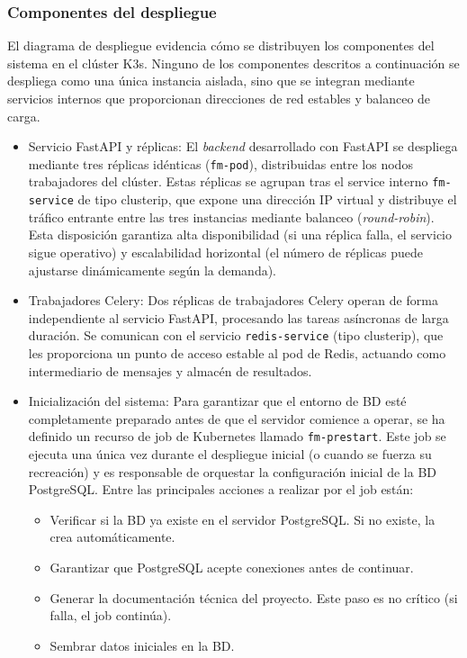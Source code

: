 \subsubsection{Componentes del despliegue}

El diagrama de despliegue evidencia cómo se distribuyen los componentes del sistema en el \gls{clúster} \gls{K3s}. 
Ninguno de los componentes descritos a continuación se despliega como una única instancia aislada, 
sino que se integran mediante servicios internos que proporcionan direcciones de red estables y 
balanceo de carga.

\begin{itemize}
    \item Servicio FastAPI y réplicas: El \textit{backend} desarrollado con FastAPI se despliega mediante 
    tres réplicas idénticas (\texttt{fm-pod}), distribuidas entre los \gls{nodo}s trabajadores del clúster. Estas réplicas 
    se agrupan tras el \gls{service} interno \texttt{fm-service} de tipo \gls{clusterip}, 
    que expone una dirección \ac{IP} virtual y distribuye el tráfico entrante entre las tres instancias 
    mediante balanceo (\textit{round-robin}). Esta disposición garantiza alta disponibilidad 
    (si una réplica falla, el servicio sigue operativo) y escalabilidad horizontal 
    (el número de réplicas puede ajustarse dinámicamente según la demanda).
    
    \item Trabajadores Celery: Dos réplicas de trabajadores Celery operan de forma independiente 
    al servicio FastAPI, procesando las tareas asíncronas de larga duración. Se comunican con el 
    servicio \texttt{redis-service} (tipo \gls{clusterip}), que les proporciona un punto de 
    acceso estable al \gls{pod} de Redis, actuando como intermediario de mensajes y almacén de resultados.
    
    \item Inicialización del sistema: Para garantizar que el entorno 
    de \ac{BD} esté completamente preparado antes de que el servidor comience a operar, 
    se ha definido un recurso de \gls{job} de Kubernetes llamado \texttt{fm-prestart}. 
    Este \gls{job} se ejecuta una única vez durante el despliegue inicial (o cuando se fuerza su recreación) 
    y es responsable de orquestar la configuración inicial de la \ac{BD} PostgreSQL. Entre las principales acciones
    a realizar por el \gls{job} están:
    \begin{itemize}
        \item Verificar si la \ac{BD} ya existe en el servidor PostgreSQL. Si no existe, la crea automáticamente.
        \item Garantizar que PostgreSQL acepte conexiones antes de continuar.
        \item Generar la documentación técnica del proyecto. Este paso es no crítico (si falla, el \gls{job} continúa).
        \item Sembrar datos iniciales en la \ac{BD}.
    \end{itemize}


\end{itemize}

